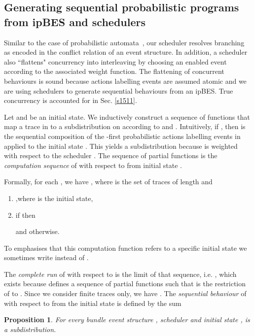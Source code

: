\documentclass[review]{elsart}
\newtheorem{proposition}[definition]{Proposition}
\newcommand{\Sec}[1]{Sec. \ref{#1}}
\begin{document}
\subsection{Generating sequential probabilistic programs from ipBES and schedulers}

Similar to the case of probabilistic automata~\cite{Seg94}, our scheduler resolves branching as encoded in the conflict relation of an event structure. In addition, a scheduler also ``flattens" concurrency into interleaving by choosing an enabled event according to the associated weight function. The flattening of concurrent behaviours is sound because actions labelling events are assumed atomic and we are using schedulers to generate sequential behaviours from an ipBES. True concurrency is accounted for in \Sec{s1511}.

Let  and  be an initial state. We inductively construct a sequence of functions  that map a trace in  to a subdistribution on  according to  and . Intuitively, if , then  is the sequential composition of the -first probabilistic actions labelling events in  applied to the initial state . This yields a subdistribution because  is weighted with respect to the scheduler . The sequence of partial functions  is the \emph{computation sequence} of  with respect to   from initial state .

Formally, for each , we have , where  is the set of traces of length  and 

\begin{enumerate}
\item ,where  is the initial state,
\item if  then 

and   otherwise.\label{pr:induction-computation-function}
\end{enumerate}

To emphasises that this computation function refers to a specific initial state  we sometimes write  instead of .

The \textit{complete run} of  with respect to  is the limit  of that sequence, i.e. , which exists because  defines a sequence of partial functions such that  is the restriction of  to . Since we consider finite traces only, we have . The \textit{sequential behaviour} of  with respect to  from the initial state  is defined by the sum 

\begin{proposition}\label{pro:scheduler-well-defined}
For every bundle event structure , scheduler  and initial state ,  is a subdistribution. 
\end{proposition}
\end{document}
